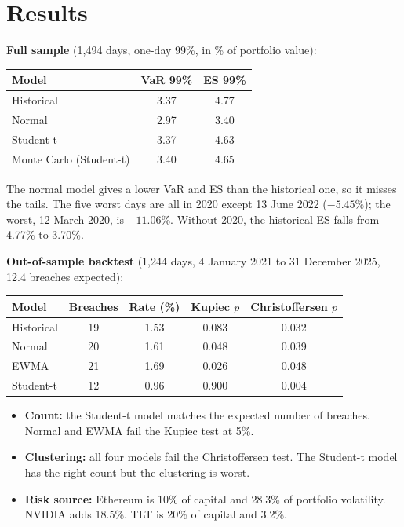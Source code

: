 \documentclass[11pt,a4paper]{article}
\begin{document}
\section{Results}
\textbf{Full sample} (1,494 days, one-day 99\%, in \% of portfolio value):

\begin{center}
\begin{tabular}{@{}lcc@{}}
\toprule
Model & VaR 99\% & ES 99\% \\
\midrule
Historical & 3.37 & 4.77 \\
Normal & 2.97 & 3.40 \\
Student-t & 3.37 & 4.63 \\
Monte Carlo (Student-t) & 3.40 & 4.65 \\
\bottomrule
\end{tabular}
\end{center}

The normal model gives a lower VaR and ES than the historical one, so it misses the tails. The five worst days are all in 2020 except 13 June 2022 ($-5.45\%$); the worst, 12 March 2020, is $-11.06\%$. Without 2020, the historical ES falls from 4.77\% to 3.70\%.

\textbf{Out-of-sample backtest} (1,244 days, 4 January 2021 to 31 December 2025, 12.4 breaches expected):

\begin{center}
\begin{tabular}{@{}lcccc@{}}
\toprule
Model & Breaches & Rate (\%) & Kupiec $p$ & Christoffersen $p$ \\
\midrule
Historical & 19 & 1.53 & 0.083 & 0.032 \\
Normal & 20 & 1.61 & 0.048 & 0.039 \\
EWMA & 21 & 1.69 & 0.026 & 0.048 \\
Student-t & 12 & 0.96 & 0.900 & 0.004 \\
\bottomrule
\end{tabular}
\end{center}

\begin{itemize}
\item \textbf{Count:} the Student-t model matches the expected number of breaches. Normal and EWMA fail the Kupiec test at 5\%.
\item \textbf{Clustering:} all four models fail the Christoffersen test. The Student-t model has the right count but the clustering is worst.
\item \textbf{Risk source:} Ethereum is 10\% of capital and 28.3\% of portfolio volatility. NVIDIA adds 18.5\%. TLT is 20\% of capital and 3.2\%.
\end{itemize}
\end{document}
